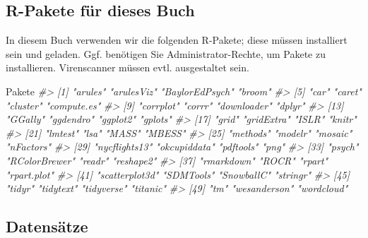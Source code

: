 \documentclass[12pt,ngerman,]{book}
\makeatletter
\newenvironment{Shaded}{\begin{snugshade}}{\end{snugshade}}
\newcommand{\CommentTok}[1]{\textcolor[rgb]{0.56,0.35,0.01}{\textit{{#1}}}}
\newcommand{\NormalTok}[1]{{#1}}
\newenvironment{kframe}{%
\medskip{}
\setlength{\fboxsep}{.8em}
 \def\at@end@of@kframe{}%
 \ifinner\ifhmode%
  \def\at@end@of@kframe{\end{minipage}}%
  \begin{minipage}{\columnwidth}%
 \fi\fi%
 \def\FrameCommand##1{\hskip\@totalleftmargin \hskip-\fboxsep
 \colorbox{shadecolor}{##1}\hskip-\fboxsep
     \hskip-\linewidth \hskip-\@totalleftmargin \hskip\columnwidth}%
 \MakeFramed {\advance\hsize-\width
   \@totalleftmargin\z@ \linewidth\hsize
   \@setminipage}}%
 {\par\unskip\endMakeFramed%
 \at@end@of@kframe}
\renewenvironment{Shaded}{\begin{kframe}}{\end{kframe}}
\makeatother
\begin{document}
\subsection{R-Pakete für dieses Buch}\label{r-pakete-fur-dieses-buch}

In diesem Buch verwenden wir die folgenden R-Pakete; diese müssen
installiert sein und geladen. Ggf. benötigen Sie Administrator-Rechte,
um Pakete zu installieren. Virenscanner müssen evtl. ausgestaltet sein.

\begin{Shaded}
\begin{Highlighting}[]
\NormalTok{Pakete }
\CommentTok{#>  [1] "arules"        "arulesViz"     "BaylorEdPsych" "broom"        }
\CommentTok{#>  [5] "car"           "caret"         "cluster"       "compute.es"   }
\CommentTok{#>  [9] "corrplot"      "corrr"         "downloader"    "dplyr"        }
\CommentTok{#> [13] "GGally"        "ggdendro"      "ggplot2"       "gplots"       }
\CommentTok{#> [17] "grid"          "gridExtra"     "ISLR"          "knitr"        }
\CommentTok{#> [21] "lmtest"        "lsa"           "MASS"          "MBESS"        }
\CommentTok{#> [25] "methods"       "modelr"        "mosaic"        "nFactors"     }
\CommentTok{#> [29] "nycflights13"  "okcupiddata"   "pdftools"      "png"          }
\CommentTok{#> [33] "psych"         "RColorBrewer"  "readr"         "reshape2"     }
\CommentTok{#> [37] "rmarkdown"     "ROCR"          "rpart"         "rpart.plot"   }
\CommentTok{#> [41] "scatterplot3d" "SDMTools"      "SnowballC"     "stringr"      }
\CommentTok{#> [45] "tidyr"         "tidytext"      "tidyverse"     "titanic"      }
\CommentTok{#> [49] "tm"            "wesanderson"   "wordcloud"}
\end{Highlighting}
\end{Shaded}

\subsection{Datensätze}\label{daten}
\end{document}
